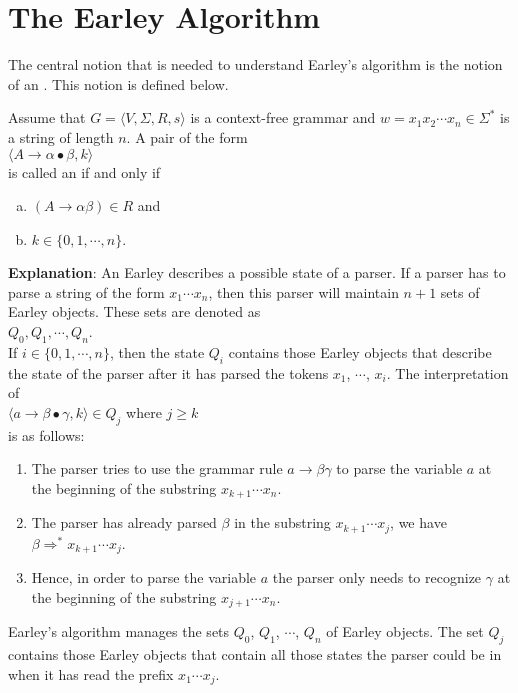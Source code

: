 \section{The Earley Algorithm}
The central notion that is needed to understand Earley's algorithm is the notion of an
.  This notion is defined below.

\begin{Definition}
  Assume that  $G = \langle V, \Sigma, R, s \rangle$ is a context-free grammar and
  $w = x_1x_2 \cdots x_n \in \Sigma^*$ is a string of length $n$.  A pair of the form
  \\[0.2cm]
  \hspace*{1.3cm}
  $\langle A \rightarrow \alpha \bullet \beta, k \rangle$
  \\[0.2cm]
  is called an  if and only if
  \begin{enumerate}[(a)]
  \item $(A \rightarrow \alpha \beta) \in R$ \quad and
  \item $k \in \{0,1,\cdots,n\}$. \eox
  \end{enumerate}
\end{Definition}

\noindent
\textbf{Explanation}: 
An Earley describes a possible state of a parser.
If a parser has to parse a string of the form $x_1 \cdots x_n$, then this parser will maintain
$n+1$ sets of Earley objects.  These sets are denoted as
\\[0.2cm]
\hspace*{1.3cm}
$Q_0, Q_1, \cdots, Q_n$.
\\[0.2cm]
If $i \in \{0,1, \cdots, n\}$, then the state $Q_i$ contains those Earley objects that describe the state of
the parser after it has parsed the tokens $x_1$, $\cdots$, $x_i$.  
The interpretation of 
\\[0.2cm]
\hspace*{1.3cm}
$\langle a \rightarrow \beta \bullet \gamma, k \rangle \in Q_j$ \quad where  $j \geq k$
\\[0.2cm]
is as follows:
\begin{enumerate}
\item The parser tries to use the grammar rule $a \rightarrow \beta \gamma$ to parse the variable $a$ at the
      beginning of the substring $x_{k+1} \cdots x_n$.
\item The parser has already parsed $\beta$ in the substring  $x_{k+1} \cdots x_j$, we have
      \\[0.2cm]
      \hspace*{1.3cm}
      $\beta \Rightarrow^* x_{k+1} \cdots x_j$.
\item Hence, in order to parse the variable $a$ the parser only needs to recognize $\gamma$ at the beginning of
      the substring $x_{j+1} \cdots x_n$.
\end{enumerate}
Earley's  algorithm manages the sets $Q_0$, $Q_1$, $\cdots$, $Q_n$  of Earley objects.  The set $Q_j$ contains
those Earley objects that contain all those states the parser could be in when it has read the prefix 
$x_1 \cdots x_j$.

